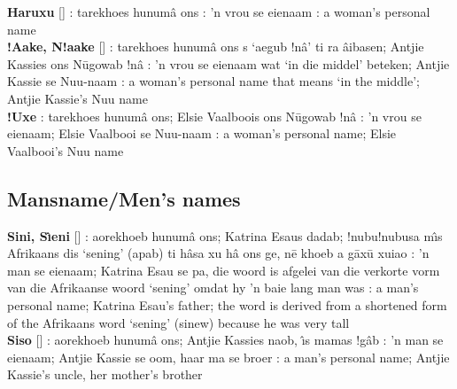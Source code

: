 \vspace{-.2em}

\textbf{\textdoublebarpipe{}Haruxu}
[] : tarekhoes
\textdoublebarpipe{}hunum\^{a} \textvertline{}ons : 'n
vrou se eienaam : a woman's personal name \\

\textbf{!Aake, N!aake} []
: tarekhoes \textdoublebarpipe{}hunum\^{a}
\textvertline{}ons s `\textdoublevertline{}aegub !n\^{a}' ti ra
\textdoublebarpipe{}\^{a}ibasen; Antjie Kassies \textvertline{}ons
\textvertline{}N\={u}gowab !n\^{a} : 'n vrou se eienaam
wat `in die middel' beteken; Antjie Kassie se N\textvertline{}uu-naam
: a woman's personal name that means `in the middle';
Antjie Kassie's N\textvertline{}uu name \\

\textbf{!Uxe} : tarekhoes
\textdoublebarpipe{}hunum\^{a} \textvertline{}ons; Elsie Vaalboois
\textvertline{}ons \textvertline{}N\={u}gowab !n\^{a} :
'n vrou se eienaam; Elsie Vaalbooi se N\textvertline{}uu-naam
: a woman's personal name; Elsie Vaalbooi's
N\textvertline{}uu name


\markboth{}{}
\subsection*{Mansname/Men's names}
\markboth{}{}

\textbf{Sini, S\^{\i}eni} []
: aorekhoeb \textdoublebarpipe{}hunum\^{a}
\textvertline{}ons; Katrina Esaus dadab; !nubu!nubusa m\^{\i}s
Afrikaans dis `sening' (\textdoublevertline{}apab) ti h\^{a}sa xu
h\^{a} \textvertline{}ons ge, n\={e} khoeb a g\={a}x\={u} xuiao
: 'n man se eienaam; Katrina Esau se pa, die woord is
afgelei van die verkorte vorm van die Afrikaanse woord `sening' omdat
hy 'n baie lang man was : a man's personal name; Katrina
Esau's father; the word is derived from a shortened form of the
Afrikaans word `sening' (sinew) because he was very tall \\

\textbf{Siso} [] : aorekhoeb
\textdoublebarpipe{}hunum\^{a} \textvertline{}ons; Antjie Kassies
\textdoublevertline{}naob, \textdoublevertline{}\^{\i}s mamas !g\^{a}b
: 'n man se eienaam; Antjie Kassie se oom, haar ma se
broer : a man's personal name; Antjie Kassie's uncle,
her mother's brother \\

